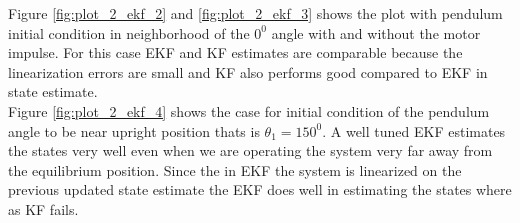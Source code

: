 \documentclass[a4paper]{article}
\begin{document}
Figure \ref{fig:plot_2_ekf_2} and \ref{fig:plot_2_ekf_3} shows the plot with pendulum initial condition in neighborhood of the $0^0$ angle with and without the motor impulse. For this case EKF and KF estimates are comparable because the linearization errors are small and KF also performs good compared to EKF in state estimate. \\

Figure \ref{fig:plot_2_ekf_4} shows the case for initial condition of the pendulum angle to be near upright position thats is $\theta_1 = 150^0$. A well tuned EKF estimates the states very well even when we are operating the system very far away from the equilibrium position. Since the in EKF the system is linearized on the previous updated state estimate the EKF does well in estimating the states where as KF fails. 
\end{document}

